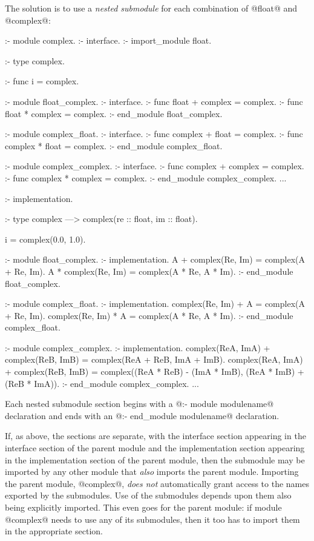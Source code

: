 The solution is to use a \emph{nested submodule} for each combination
of @float@ and @complex@:
\begin{myverbatim}
:- module complex.
:- interface.
:- import_module float.

:- type complex.

:- func i = complex.

    :- module float_complex.    %
    :- interface.
    :- func float   + complex = complex.
    :- func float   * complex = complex.
    :- end_module float_complex.

    :- module complex_float.    %
    :- interface.
    :- func complex + float   = complex.
    :- func complex * float   = complex.
    :- end_module complex_float.

    :- module complex_complex.  %
    :- interface.
    :- func complex + complex = complex.
    :- func complex * complex = complex.
    :- end_module complex_complex.
...

:- implementation.

:- type complex ---> complex(re :: float, im :: float).

i = complex(0.0, 1.0).

    :- module float_complex.    %
    :- implementation.
    A + complex(Re, Im) = complex(A + Re,     Im).
    A * complex(Re, Im) = complex(A * Re, A * Im).
    :- end_module float_complex.

    :- module complex_float.    %
    :- implementation.
    complex(Re, Im) + A = complex(A + Re,     Im).
    complex(Re, Im) * A = complex(A * Re, A * Im).
    :- end_module complex_float.

    :- module complex_complex.  %
    :- implementation.
    complex(ReA, ImA) + complex(ReB, ImB) =
        complex(ReA + ReB, ImA + ImB).
    complex(ReA, ImA) + complex(ReB, ImB) =
        complex((ReA * ReB) - (ImA * ImB),
                (ReA * ImB) + (ReB * ImA)).
    :- end_module complex_complex.
...
\end{myverbatim}
Each nested submodule section begins with a @:- module modulename@
declaration and ends with an @:- end_module modulename@ declaration.

If, as above, the sections are separate, with the interface section
appearing in the interface section of the parent module and the
implementation section appearing in the implementation section of the
parent module, then the submodule may be imported by any other module
that \emph{also} imports the parent module.  Importing the parent
module, @complex@, \emph{does not} automatically grant access to the
names exported by the submodules.  Use of the submodules depends upon
them also being explicitly imported.  This even goes for the parent
module: if module @complex@ needs to use any of its submodules, then it
too has to import them in the appropriate section.

